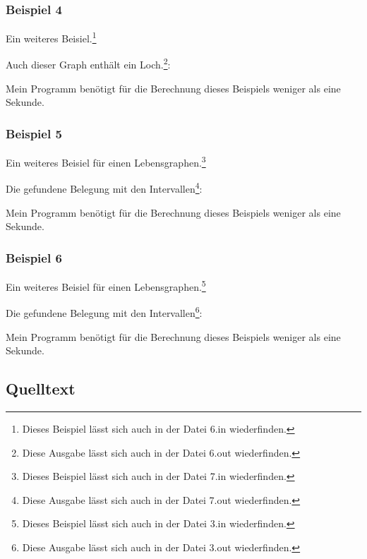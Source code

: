 \subsubsection*{Beispiel 4}
Ein weiteres Beisiel.\footnote{Dieses Beispiel lässt sich auch in der Datei 6.in wiederfinden.}

{\small

}

Auch dieser Graph enthält ein Loch.\footnote{Diese Ausgabe lässt sich auch in der Datei 6.out wiederfinden.}:

{\small

}

Mein Programm benötigt für die Berechnung dieses Beispiels weniger als eine Sekunde.

\subsubsection*{Beispiel 5}
Ein weiteres Beisiel für einen Lebensgraphen.\footnote{Dieses Beispiel lässt sich auch in der Datei 7.in wiederfinden.}

{\small

}

Die gefundene Belegung mit den Intervallen\footnote{Diese Ausgabe lässt sich auch in der Datei 7.out wiederfinden.}:

{\small

}

Mein Programm benötigt für die Berechnung dieses Beispiels weniger als eine Sekunde.

\subsubsection*{Beispiel 6}
Ein weiteres Beisiel für einen Lebensgraphen.\footnote{Dieses Beispiel lässt sich auch in der Datei 3.in wiederfinden.}

{\small

}

Die gefundene Belegung mit den Intervallen\footnote{Diese Ausgabe lässt sich auch in der Datei 3.out wiederfinden.}:

{\small

}

Mein Programm benötigt für die Berechnung dieses Beispiels weniger als eine Sekunde.

\subsection{Quelltext}

